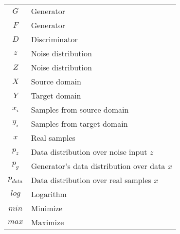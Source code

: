 

\begin{tabular}{cp{}}
  $G$ & Generator \\
  $F$ &  Generator \\
  $D$ & Discriminator \\
  $z$  & Noise distribution\\
  $Z$  & Noise distribution\\
  $X$  & Source domain\\
  $Y$  & Target domain\\
  $x_i$  & Samples from source domain\\
  $y_i$  & Samples from target domain\\
  $x$ & Real samples\\
  $p_z$ & Data distribution over noise input $z$\\
  $p_g$ & Generator’s data distribution over data $x$\\
  $p_{data}$ & Data distribution over real samples $x$\\
  $log$ & Logarithm \\
  $min$ & Minimize\\
  $max$ & Maximize\\



  
\end{tabular}\\